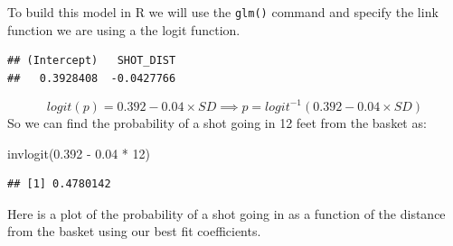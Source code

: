 \documentclass[
]{book}
\newenvironment{Shaded}{\begin{snugshade}}{\end{snugshade}}
\newcommand{\AttributeTok}[1]{\textcolor[rgb]{0.77,0.63,0.00}{#1}}
\newcommand{\DecValTok}[1]{\textcolor[rgb]{0.00,0.00,0.81}{#1}}
\newcommand{\FloatTok}[1]{\textcolor[rgb]{0.00,0.00,0.81}{#1}}
\newcommand{\FunctionTok}[1]{\textcolor[rgb]{0.00,0.00,0.00}{#1}}
\newcommand{\NormalTok}[1]{#1}
\newcommand{\OtherTok}[1]{\textcolor[rgb]{0.56,0.35,0.01}{#1}}
\newcommand{\SpecialCharTok}[1]{\textcolor[rgb]{0.00,0.00,0.00}{#1}}
\newcommand{\StringTok}[1]{\textcolor[rgb]{0.31,0.60,0.02}{#1}}
\theoremstyle{definition}
\theoremstyle{definition}
\theoremstyle{definition}
\theoremstyle{definition}
\theoremstyle{remark}
\begin{document}
To build this model in R we will use the \texttt{glm()} command and specify the link function we are using a the logit function.

\begin{Shaded}
\end{Shaded}

\begin{verbatim}
## (Intercept)   SHOT_DIST 
##   0.3928408  -0.0427766
\end{verbatim}

\[logit(p)=0.392-0.04 \times SD \implies p=logit^{-1}(0.392-0.04 \times SD)\]
So we can find the probability of a shot going in 12 feet from the basket as:

\begin{Shaded}
\begin{Highlighting}[]
\FunctionTok{invlogit}\NormalTok{(}\FloatTok{0.392} \SpecialCharTok{{-}} \FloatTok{0.04} \SpecialCharTok{*} \DecValTok{12}\NormalTok{)}
\end{Highlighting}
\end{Shaded}

\begin{verbatim}
## [1] 0.4780142
\end{verbatim}

Here is a plot of the probability of a shot going in as a function of the distance from the basket using our best fit coefficients.

\begin{Shaded}
\end{Shaded}
\end{document}
